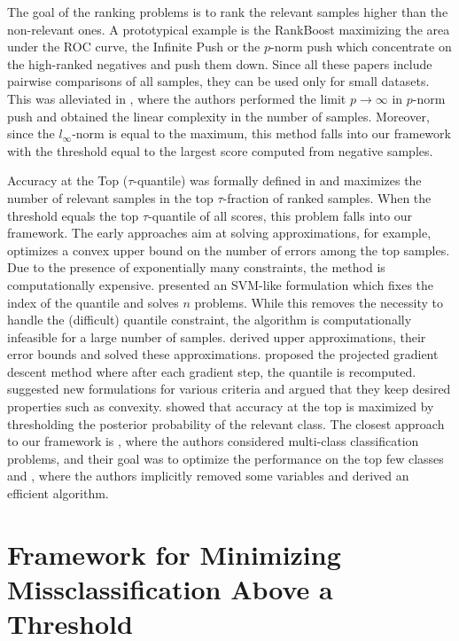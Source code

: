 The goal of the ranking problems is to rank the relevant samples higher than the non-relevant ones. A prototypical example is the RankBoost \cite{freund2003efficient} maximizing the area under the ROC curve, the Infinite Push \cite{agarwal2011infinite} or the $p$-norm push \cite{rudin2009pnorm} which concentrate on the high-ranked negatives and push them down. Since all these papers include pairwise comparisons of all samples, they can be used only for small datasets. This was alleviated in \cite{li2014top}, where the authors performed the limit $p \to \infty$ in $p$-norm push and obtained the linear complexity in the number of samples. Moreover, since the $l_{\infty}$-norm is equal to the maximum, this method falls into our framework with the threshold equal to the largest score computed from negative samples.

Accuracy at the Top ($\tau$-quantile) was formally defined in \cite{boyd2012accuracy} and maximizes the number of relevant samples in the top $\tau$-fraction of ranked samples. When the threshold equals the top $\tau$-quantile of all scores, this problem falls into our framework. The early approaches aim at solving approximations, for example, \cite{joachims2005svm} optimizes a convex upper bound on the number of errors among the top samples. Due to the presence of exponentially many constraints, the method is computationally expensive. \cite{boyd2012accuracy} presented an SVM-like formulation which fixes the index of the quantile and solves $n$ problems. While this removes the necessity to handle the (difficult) quantile constraint, the algorithm is computationally infeasible for a large number of samples. \cite{kar2015surrogate} derived upper approximations, their error bounds and solved these approximations. \cite{grill2016learning} proposed the projected gradient descent method where after each gradient step, the quantile is recomputed. \cite{eban2017scalable} suggested new formulations for various criteria and argued that they keep desired properties such as convexity. \cite{tasche2018plug} showed that accuracy at the top is maximized by thresholding the posterior probability of the relevant class. The closest approach to our framework is \cite{lapin2015top,lapin2018analysis}, where the authors considered multi-class classification problems, and their goal was to optimize the performance on the top few classes and \cite{mackey2018constrained}, where the authors implicitly removed some variables and derived an efficient algorithm.

\section{Framework for Minimizing Missclassification Above a Threshold}\label{sec:framework}

